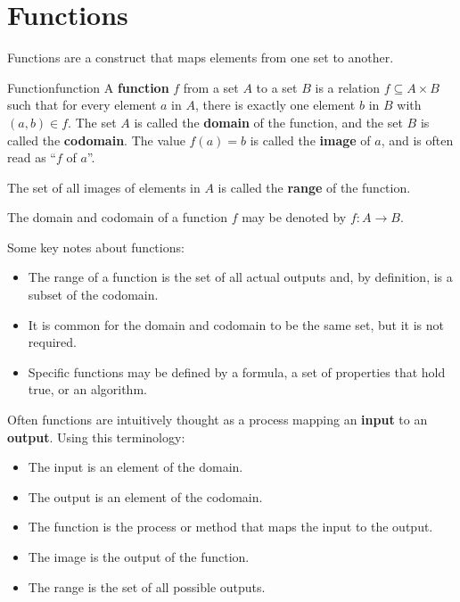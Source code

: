 \section{Functions}

Functions are a construct that maps elements from one set to another.

\begin{definition}{Function}{function}
  A \textbf{function} \( f \) from a set \( A \) to a set \( B \) is a relation
  \( f \subseteq A \times B \) such that for every element \( a \) in \( A \),
  there is exactly one element \( b \) in \( B \) with \( (a, b) \in f \).
  The set \( A \) is called the \textbf{domain} of the function, and the set
  \( B \) is called the \textbf{codomain}. The value \( f(a) = b \) is called the
  \textbf{image} of \( a \), and is often read as ``\( f \) of \( a \)''.

  \medskip

  The set of all images of elements in \( A \) is called the \textbf{range} of
  the function.

  \medskip

  The domain and codomain of a function \( f \) may be denoted by \( f: A \to B \).
\end{definition}

Some key notes about functions:
\begin{itemize}
  \item The range of a function is the set of all actual outputs and, by
    definition, is a subset of the codomain.
  \item It is common for the domain and codomain to be the same set, but it is not
    required.
  \item Specific functions may be defined by a formula, a set of properties that hold true,
    or an algorithm.
\end{itemize}

Often functions are intuitively thought as a process mapping an \textbf{input} to
an \textbf{output}. Using this terminology:
\begin{itemize}
  \item The input is an element of the domain.
  \item The output is an element of the codomain.
  \item The function is the process or method that maps the input to the output.
  \item The image is the output of the function.
  \item The range is the set of all possible outputs.
\end{itemize}


